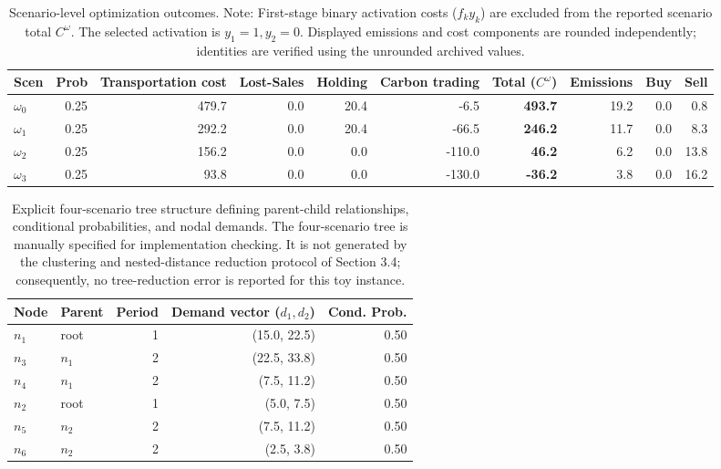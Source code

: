 \documentclass[11pt,a4paper]{article}
\begin{document}
\begin{table}[ht]\small
\centering
\caption{Scenario-level optimization outcomes. Note: First-stage binary activation costs ($f_k y_k$) are excluded from the reported scenario total $C^\omega$. The selected activation is $y_1=1, y_2=0$. Displayed emissions and cost components are rounded independently; identities are verified using the unrounded archived values.}
\begin{tabular}{lrrrrrrrrr}
\toprule
Scen & Prob & Transportation cost & Lost-Sales & Holding & Carbon trading & Total ($C^\omega$) & Emissions & Buy & Sell \\
\midrule
$\omega_{0}$ & 0.25 & 479.7 & 0.0 & 20.4 & -6.5 & \textbf{493.7} & 19.2 & 0.0 & 0.8 \\
$\omega_{1}$ & 0.25 & 292.2 & 0.0 & 20.4 & -66.5 & \textbf{246.2} & 11.7 & 0.0 & 8.3 \\
$\omega_{2}$ & 0.25 & 156.2 & 0.0 & 0.0 & -110.0 & \textbf{46.2} & 6.2 & 0.0 & 13.8 \\
$\omega_{3}$ & 0.25 & 93.8 & 0.0 & 0.0 & -130.0 & \textbf{-36.2} & 3.8 & 0.0 & 16.2 \\
\bottomrule
\end{tabular}
\label{tab:scenarios}
\end{table}

\begin{table}[ht]\small
\centering
\caption{Explicit four-scenario tree structure defining parent-child relationships, conditional probabilities, and nodal demands. The four-scenario tree is manually specified for implementation checking. It is not generated by the clustering and nested-distance reduction protocol of Section 3.4; consequently, no tree-reduction error is reported for this toy instance.}
\begin{tabular}{llrrr}
\toprule
Node & Parent & Period & Demand vector ($d_1, d_2$) & Cond. Prob. \\
\midrule
$n_1$ & root & 1 & (15.0, 22.5) & 0.50 \\
$n_3$ & $n_{1}$ & 2 & (22.5, 33.8) & 0.50 \\
$n_4$ & $n_{1}$ & 2 & (7.5, 11.2) & 0.50 \\
$n_2$ & root & 1 & (5.0, 7.5) & 0.50 \\
$n_5$ & $n_{2}$ & 2 & (7.5, 11.2) & 0.50 \\
$n_6$ & $n_{2}$ & 2 & (2.5, 3.8) & 0.50 \\
\bottomrule
\end{tabular}
\label{tab:tree}
\end{table}
\end{document}
